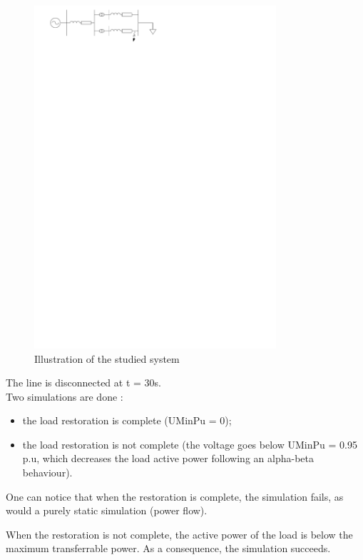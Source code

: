 \documentclass[a4paper, 12pt]{report}
\begin{document}
\begin{figure}[H]
  \begin{center}
  \includegraphics[width=0.8\textwidth]{LoadRestoration/LoadRestoration}
  \end{center}
  \caption{Illustration of the studied system}
\end{figure}

The line is disconnected at t = 30s.\\
Two simulations are done :
\begin{itemize}
\item the load restoration is complete (UMinPu = 0);
\item the load restoration is not complete (the voltage goes below UMinPu = 0.95 p.u, which decreases the load active power following an alpha-beta behaviour).
\end{itemize}

One can notice that when the restoration is complete, the simulation fails, as would a purely static simulation (power flow).

When the restoration is not complete, the active power of the load is below the maximum transferrable power. As a consequence, the simulation succeeds.
\end{document}
